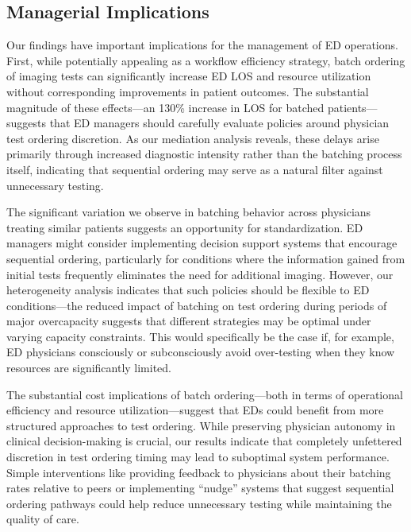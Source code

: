 \documentclass[,,nonblindrev]{informs}
\begin{document}
\subsection{Managerial Implications}\label{managerial-implications}

Our findings have important implications for the management of ED
operations. First, while potentially appealing as a workflow efficiency
strategy, batch ordering of imaging tests can significantly increase ED
LOS and resource utilization without corresponding improvements in
patient outcomes. The substantial magnitude of these effects---an 130\%
increase in LOS for batched patients---suggests that ED managers should
carefully evaluate policies around physician test ordering discretion.
As our mediation analysis reveals, these delays arise primarily through
increased diagnostic intensity rather than the batching process itself,
indicating that sequential ordering may serve as a natural filter
against unnecessary testing.

The significant variation we observe in batching behavior across
physicians treating similar patients suggests an opportunity for
standardization. ED managers might consider implementing decision
support systems that encourage sequential ordering, particularly for
conditions where the information gained from initial tests frequently
eliminates the need for additional imaging. However, our heterogeneity
analysis indicates that such policies should be flexible to ED
conditions---the reduced impact of batching on test ordering during
periods of major overcapacity suggests that different strategies may be
optimal under varying capacity constraints. This would specifically be
the case if, for example, ED physicians consciously or subconsciously
avoid over-testing when they know resources are significantly limited.

The substantial cost implications of batch ordering---both in terms of
operational efficiency and resource utilization---suggest that EDs could
benefit from more structured approaches to test ordering. While
preserving physician autonomy in clinical decision-making is crucial,
our results indicate that completely unfettered discretion in test
ordering timing may lead to suboptimal system performance. Simple
interventions like providing feedback to physicians about their batching
rates relative to peers or implementing ``nudge'' systems that suggest
sequential ordering pathways could help reduce unnecessary testing while
maintaining the quality of care.
\end{document}
